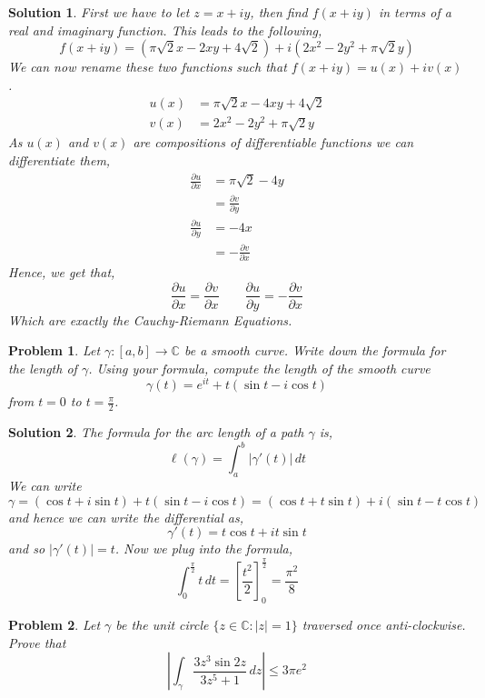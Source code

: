 \documentclass{article}
\newcommand{\C}{\mathbb{C}}
\newcommand{\g}{\gamma}
\newcommand{\pd}[2]{\frac{\partial #1}{\partial #2}}
\newtheorem{problem}{Problem}
\newtheorem{solution}{Solution}
\begin{document}
\begin{solution}
  First we have to let $z = x + iy$, then find $f(x + iy)$ in terms of a real and imaginary function. This leads to the following,
  $$ f(x + iy) = (\pi\sqrt 2 x - 2xy + 4\sqrt 2) + i(2x^2 - 2y^2 + \pi \sqrt 2 y) $$
  We can now rename these two functions such that $f(x + iy) = u(x) + iv(x)$.
  \begin{align*}
    u(x) &= \pi\sqrt 2 x - 4xy + 4\sqrt 2\\
    v(x) &= 2x^2 - 2y^2 + \pi \sqrt 2 y
  \end{align*}
  As $u(x)$ and $v(x)$ are compositions of differentiable functions we can differentiate them,
  \begin{align*}
    \pd{u}{x} &= \pi\sqrt 2 - 4y\\
    &= \pd{v}{y}\\
    \pd{u}{y} &= -4x\\
    &= -\pd{v}{x}
  \end{align*}
  Hence, we get that,
  $$ \pd{u}{x} = \pd{v}{x} \qquad \pd{u}{y} = -\pd{v}{x} $$
  Which are exactly the Cauchy-Riemann Equations.
\end{solution}


\begin{problem}
  Let $\g : [a, b] \to \C$ be a smooth curve. Write down the formula for the length of $\g$. Using your formula, compute the length of the smooth curve $$\g(t) = e^{it} + t(\sin t - i \cos t)$$
  from $t = 0$ to $t = \frac{\pi}{2}$.
\end{problem}

\begin{solution}
  The formula for the arc length of a path $\g$ is,
  $$ \ell (\g) = \int_a^b {|\g'(t)|\,dt} $$
  We can write $\g = (\cos t + i\sin t) + t(\sin t - i \cos t) = (\cos t + t\sin t) + i(\sin t - t\cos t)$ and hence we can write the differential as,
  $$ \g'(t) = t\cos t + it\sin t $$
  and so $|\g'(t)| = t$. Now we plug into the formula,
  $$ \int_0^{\frac{\pi}{2}} {t\,dt} = \left[ \frac{t^2}{2} \right]_0^{\frac{\pi}{2}}  = \frac{\pi^2}{8}$$
\end{solution}

\newpage
\begin{problem}
  Let $\g$ be the unit circle $\{z \in \C : |z| = 1\}$ traversed once anti-clockwise. Prove that
  $$ \left | \int_\g \frac{3z^3\sin {2z}}{3z^5 + 1}\,dz \right | \le 3\pi e^2$$
\end{problem}
\end{document}
